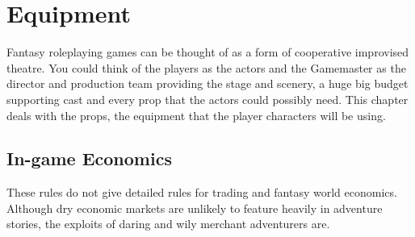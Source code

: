 \chapter{Equipment}
\label{ch:equipment}

Fantasy roleplaying games can be thought of as a form of cooperative improvised theatre. You could think of the players as the actors and the Gamemaster as the director and production team providing the stage and scenery, a huge big budget supporting cast and every prop that the actors could possibly need. This chapter deals with the props, the equipment that the player characters will be using.

\section{In-game Economics}
These rules do not give detailed rules for trading and fantasy world economics. Although dry economic markets are unlikely to feature heavily in adventure stories, the exploits of daring and wily merchant adventurers are. %




